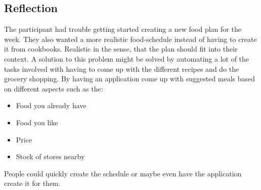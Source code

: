 \subsection{Reflection} \label{FoodPlanStudyReflection}
The participant had trouble getting started creating a new food plan for the week. They also wanted a more realistic food-schedule instead of having to create it from cookbooks. Realistic in the sense, that the plan should fit into their context. A solution to this problem might be solved by automating a lot of the tasks involved with having to come up with the different recipes and do the grocery shopping.
By having an application come up with suggested meals based on different aspects such as the:
\begin{itemize}
\item Food you already have
\item Food you like
\item Price
\item Stock of stores nearby
\end{itemize}
People could quickly create the schedule or maybe even have the application create it for them.